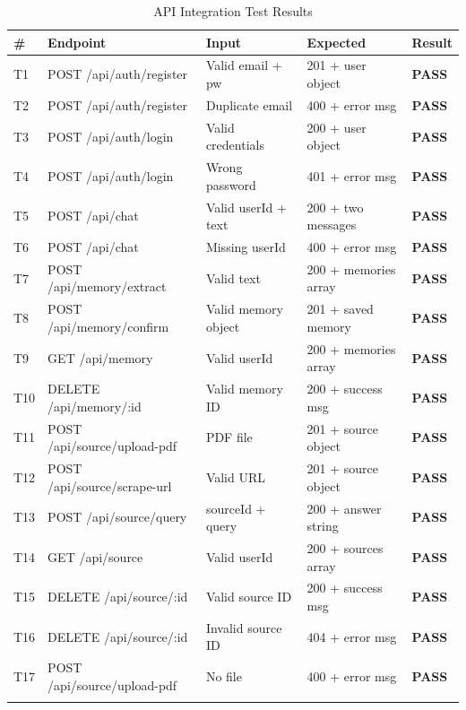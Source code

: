 \documentclass[12pt,a4paper]{report}
\begin{document}
\begin{longtable}{@{}p{0.5cm} p{3.5cm} p{2.8cm} p{3cm} p{2.5cm}@{}}
\toprule
\textbf{\#} & \textbf{Endpoint} & \textbf{Input} & \textbf{Expected} & \textbf{Result} \\
\midrule
\endhead
T1  & POST /api/auth/register & Valid email + pw     & 201 + user object     & \textbf{PASS} \\
T2  & POST /api/auth/register & Duplicate email      & 400 + error msg       & \textbf{PASS} \\
T3  & POST /api/auth/login    & Valid credentials    & 200 + user object     & \textbf{PASS} \\
T4  & POST /api/auth/login    & Wrong password       & 401 + error msg       & \textbf{PASS} \\
T5  & POST /api/chat          & Valid userId + text  & 200 + two messages    & \textbf{PASS} \\
T6  & POST /api/chat          & Missing userId       & 400 + error msg       & \textbf{PASS} \\
T7  & POST /api/memory/extract & Valid text          & 200 + memories array  & \textbf{PASS} \\
T8  & POST /api/memory/confirm & Valid memory object & 201 + saved memory    & \textbf{PASS} \\
T9  & GET  /api/memory        & Valid userId         & 200 + memories array  & \textbf{PASS} \\
T10 & DELETE /api/memory/:id  & Valid memory ID      & 200 + success msg     & \textbf{PASS} \\
T11 & POST /api/source/upload-pdf & PDF file        & 201 + source object   & \textbf{PASS} \\
T12 & POST /api/source/scrape-url & Valid URL       & 201 + source object   & \textbf{PASS} \\
T13 & POST /api/source/query  & sourceId + query     & 200 + answer string   & \textbf{PASS} \\
T14 & GET  /api/source        & Valid userId         & 200 + sources array   & \textbf{PASS} \\
T15 & DELETE /api/source/:id  & Valid source ID      & 200 + success msg     & \textbf{PASS} \\
T16 & DELETE /api/source/:id  & Invalid source ID    & 404 + error msg       & \textbf{PASS} \\
T17 & POST /api/source/upload-pdf & No file        & 400 + error msg       & \textbf{PASS} \\
\bottomrule
\caption{API Integration Test Results}
\label{tab:api_tests}
\end{longtable}
\end{document}
